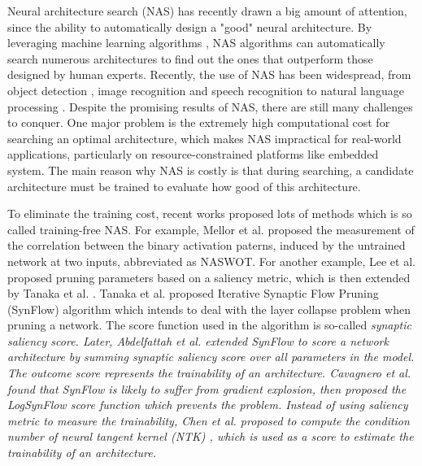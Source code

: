 \documentclass[sigconf]{acmart}
\begin{document}
    Neural architecture search (NAS) has recently drawn a big amount of 
    attention, since the ability to automatically design a "good" neural 
    architecture. By leveraging machine learning algorithms 
    \cite{https://doi.org/10.48550/arxiv.1611.01578}, NAS algorithms can 
    automatically search numerous architectures to find out the ones 
    that outperform those designed by human experts. Recently, the use of NAS has been widespread, 
    from object detection \cite{https://doi.org/10.48550/arxiv.2111.13336}, 
    image recognition \cite{https://doi.org/10.48550/arxiv.2006.04647} 
    and speech recognition \cite{https://doi.org/10.48550/arxiv.2011.05649} 
    to natural language processing \cite{jiang-etal-2019-improved}. 
    Despite the promising results of NAS, there are still many challenges 
    to conquer. One major problem is the extremely high computational 
    cost for searching an optimal architecture, which makes NAS 
    impractical for real-world applications, particularly on resource-constrained 
    platforms like embedded system. The main reason why NAS is costly is that 
    during searching, a candidate architecture must be trained to 
    evaluate how good of this architecture. 

    To eliminate the training cost, recent works proposed lots 
    of methods which is so called training-free NAS. 
    For example, Mellor et al. \cite{https://doi.org/10.48550/arxiv.2006.04647} 
    proposed the measurement of the correlation between the binary 
    activation paterns, induced by the untrained network at two inputs, 
    abbreviated as NASWOT. 
    For another example, Lee et al. \cite{lee2019snip} proposed pruning 
    parameters based on a saliency metric, which is then extended by 
    Tanaka et al. \cite{tanaka2020pruning}. Tanaka et al. proposed 
    Iterative Synaptic Flow Pruning (SynFlow) algorithm 
    which intends to deal with the layer collapse problem when pruning a 
    network. The score function used in the algorithm is so-called 
    \it{synaptic saliency} \rm{score}. Later, Abdelfattah et al. 
    \cite{abdelfattah2021zerocost} extended SynFlow to score a network 
    architecture by summing synaptic saliency score over all parameters 
    in the model. The outcome score represents the trainability of an 
    architecture. Cavagnero et al. \cite{Cavagnero_2023} found that 
    SynFlow is likely to suffer from gradient explosion, then proposed 
    the LogSynFlow score function which prevents the problem. 
    Instead of using saliency metric to measure the trainability, Chen et al. 
    \cite{https://doi.org/10.48550/arxiv.2102.11535} proposed to compute 
    the condition number of neural tangent kernel (NTK) 
    \cite{https://doi.org/10.48550/arxiv.2109.00817}, which is used as 
    a score to estimate the trainability of an architecture. 
\end{document}
